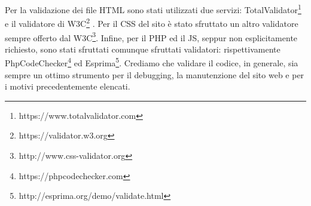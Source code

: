 Per la validazione dei file HTML sono stati utilizzati due servizi: TotalValidator\footnote{https://www.totalvalidator.com} e il validatore di W3C\footnote{https://validator.w3.org} . Per il CSS del sito è stato sfruttato un altro validatore sempre offerto dal W3C\footnote{http://www.css-validator.org}. Infine, per il PHP ed il JS, seppur non esplicitamente richiesto, sono stati sfruttati comunque sfruttati validatori: rispettivamente PhpCodeChecker\footnote{https://phpcodechecker.com} ed Esprima\footnote{http://esprima.org/demo/validate.html}. Crediamo che validare il codice, in generale, sia sempre un ottimo strumento per il debugging, la manutenzione del sito web e per i motivi precedentemente elencati.